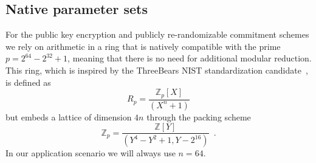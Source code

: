 \begin{comment}
To use the above transformations, we are left with multiplication in the rings $\Z_q[x]/(x^3 - r_i)$.  Given
two elements $a(x) = a_0 + a_1 x + a_2 x^2$ and $b(x) = b_0 + b_1 x + b_2 x^2$, we could compute 
the product using Toom-Cook in 5 multiplications, but the interpolation step requires division by $6$
which would amount to a multiplication or to a seperate routine executing division by 3 and a shift.
To avoid this, we use a two step Karatsuba multiply:
\bit
\item Compute $c_0 = a_0b_0$, $c_1 = a_1 b_1$, $c_2 = a_2 b_2$
\item Compute $d_0 = (a_0 + a_1) (b_0 + b_1)$ and $d_1 = (a_1 + a_2)(b_1 + b_2)$ and $d_2 = (a_0 + a_1 + a_2)(b_0 + b_1 + b_2)$
\eit
The the product polynomial is given by:
\[
[c_0,  d_0 - c_0 - c_1,   d_2 - d_0 - d_1 + 2c_1,    d_1 - c_1 - c_2,   c_2] \, .
\]
These formulae need 6 multiplications and 14 additions to compute the product.  
Of course, we still have to reduce mod
$x^3 - r_i$, which gives another 2 multiplications and 2 additions, so a total of 8 multiplications and 16 additions.

To multiply two elements in the ring $R_{p, 9, n}$ we therefore require:
\bit
\item Two mappings to the product ring, which constists of $n$ rings of degree $3$
\item $n$ multiplications of degree 2 elements in such rings, totalling $8n$ mults and $16n$ additions
\item One inverse mapping to the polynomial ring
\eit
The overall cost therefore is:
\[   25n + 9n/2 \log_2(n/2) \text{ multiplications and }    6n \log_2(n/2) + 22 n \text{ additions } \, .   \]
Using the embedding strategy in the ring of dimension $4n$ would give
\[  64n + 12n \log_2(n/2) \text{ multiplications and }  12n \log_2(n/2) + 36n \text{ additions } \, . \]

Example: for $n = 64$ we thus obtain 3032 multiplications vs.\ 7936 multiplications for the embedding strategy.
\end{comment}

\subsection{Native parameter sets}
\label{section:native-parameter-sets}

For the public key encryption and publicly re-randomizable commitment schemes we rely on arithmetic in a ring that is natively compatible with the prime $p = 2^{64} - 2^{32} + 1$, meaning that there is no need for additional modular reduction. This ring, which is inspired by the ThreeBears NIST standardization candidate~\cite{threebears}, is defined as 
$$ R_p = \frac{\mathbb{Z}_p[X]}{(X^n+1)} $$
but embeds a lattice of dimension $4n$ through the packing scheme
$$ \mathbb{Z}_p = \frac{\mathbb{Z}[Y]}{(Y^4 - Y^2 + 1, Y-2^{16})} \enspace .$$
In our application scenario we will always use $n = 64$.

